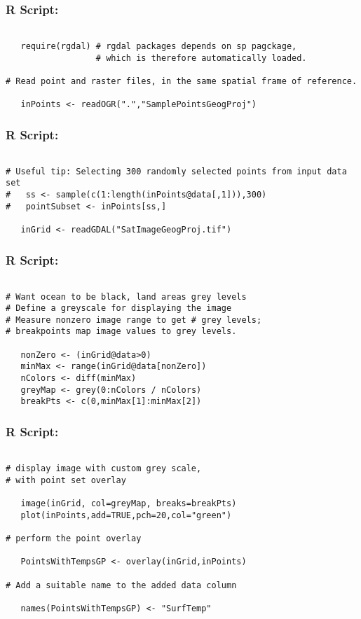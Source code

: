 \documentclass{beamer}
\begin{document}
\begin{frame}[fragile]
\frametitle{R Script:}
\begin{framed}
\begin{verbatim}

   require(rgdal) # rgdal packages depends on sp pagckage,
                  # which is therefore automatically loaded.

# Read point and raster files, in the same spatial frame of reference.

   inPoints <- readOGR(".","SamplePointsGeogProj")
\end{verbatim}
\end{framed}
\end{frame}
\begin{frame}[fragile]
\frametitle{R Script:}
\begin{framed}
\begin{verbatim}

# Useful tip: Selecting 300 randomly selected points from input data set
#   ss <- sample(c(1:length(inPoints@data[,1])),300) 
#   pointSubset <- inPoints[ss,]

   inGrid <- readGDAL("SatImageGeogProj.tif")
\end{verbatim}
\end{framed}
\end{frame}
\begin{frame}[fragile]
\frametitle{R Script:}
\begin{framed}
\begin{verbatim}
   
# Want ocean to be black, land areas grey levels
# Define a greyscale for displaying the image
# Measure nonzero image range to get # grey levels;
# breakpoints map image values to grey levels.
   
   nonZero <- (inGrid@data>0)
   minMax <- range(inGrid@data[nonZero])  
   nColors <- diff(minMax)
   greyMap <- grey(0:nColors / nColors)
   breakPts <- c(0,minMax[1]:minMax[2])
\end{verbatim}
\end{framed}
\end{frame}
\begin{frame}[fragile]
\frametitle{R Script:}
\begin{framed}
\begin{verbatim}

# display image with custom grey scale, 
# with point set overlay

   image(inGrid, col=greyMap, breaks=breakPts)
   plot(inPoints,add=TRUE,pch=20,col="green")             

# perform the point overlay

   PointsWithTempsGP <- overlay(inGrid,inPoints)

# Add a suitable name to the added data column

   names(PointsWithTempsGP) <- "SurfTemp"
\end{verbatim}
\end{framed}
\end{frame}
\end{document}
